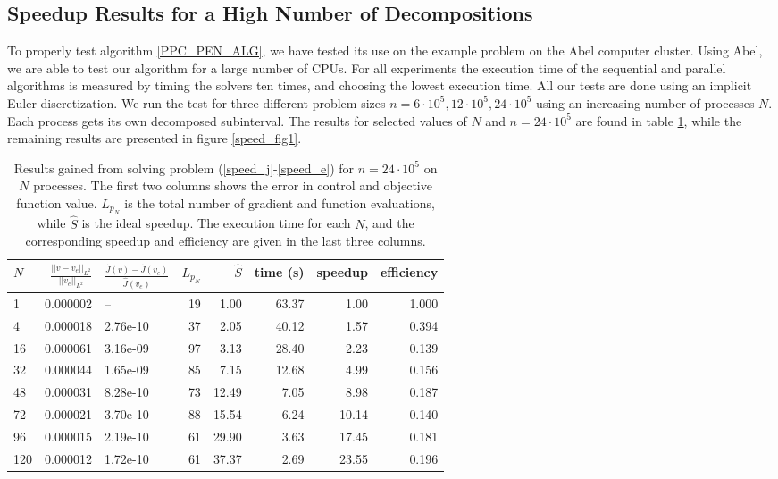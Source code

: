 \subsection{Speedup Results for a High Number of Decompositions} \label{Aspeed_sec}
To properly test algorithm \ref{PPC_PEN_ALG}, we have tested its use on the example problem on the Abel computer cluster. Using Abel, we are able to test our algorithm for a large number of CPUs. For all experiments the execution time of the sequential and parallel algorithms is measured by timing the solvers ten times, and choosing the lowest execution time. All our tests are done using an implicit Euler discretization. We run the test for three different problem sizes $n=6\cdot 10^5,12\cdot 10^5,24\cdot 10^5$ using an increasing number of processes $N$. Each process gets its own decomposed subinterval. The results for selected values of $N$ and $n= 24\cdot 10^5$ are found in table \ref{speed1}, while the remaining results are presented in figure \ref{speed_fig1}.
\\
\begin{table}[h]
\centering
\caption{Results gained from solving problem (\ref{speed_j}-\ref{speed_e}) for $n=24\cdot 10^5$ on $N$ processes. The first two columns shows the error in control and objective function value. $L_{p_N}$ is the total number of gradient and function evaluations, while $\hat S$ is the ideal speedup. The execution time for each $N$, and the corresponding speedup and efficiency are given in the last three columns.}
\label{speed1}
\begin{tabular}{lrlrrrrr}
\toprule
{}$N$ &   $\frac{||v-v_e||_{L^2}}{||v_e||_{L^2}}$ &     $\frac{\hat J(v)-\hat J(v_e)}{\hat{J}(v_e)}$ &   $L_{p_N}$ &     $\hat S$ &       time (s) &    speedup &        efficiency \\
\midrule
1   &  0.000002 &           -- &  19 &   1.00 &  63.37 &   1.00 &  1.000 \\
4   &  0.000018 &  2.76e-10 &  37 &   2.05 &  40.12 &   1.57 &  0.394 \\
16  &  0.000061 &  3.16e-09 &  97 &   3.13 &  28.40 &   2.23 &  0.139 \\
32  &  0.000044 &   1.65e-09 &  85 &   7.15 &  12.68 &   4.99 &  0.156 \\
48  &  0.000031 &  8.28e-10 &  73 &  12.49 &   7.05 &   8.98 &  0.187 \\
72  &  0.000021 &  3.70e-10 &  88 &  15.54 &   6.24 &  10.14 &  0.140 \\
96  &  0.000015 &  2.19e-10 &  61 &  29.90 &   3.63 &  17.45 &  0.181 \\
120 &  0.000012 &  1.72e-10 &  61 &  37.37 &   2.69 &  23.55 &  0.196 \\
\bottomrule
\end{tabular}
\end{table}
